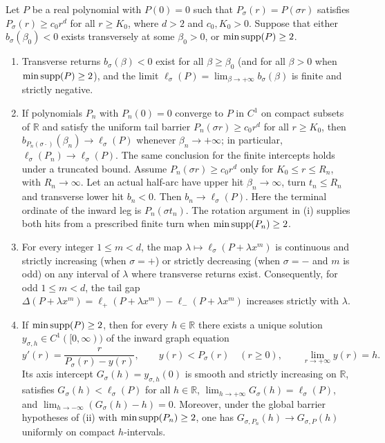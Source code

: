 \begin{lemma}\label{lem:tail-inward}
Let $P$ be a real polynomial with $P(0)=0$ such that $P_\sigma(r)=P(\sigma r)$ satisfies
$P_\sigma(r)\ge c_0 r^d$ for all $r\ge K_0$, where $d>2$ and $c_0,K_0>0$. Suppose that either
$b_\sigma(\beta_0)<0$ exists transversely at some $\beta_0>0$, or $\min\operatorname{supp}(P)\ge 2$.
\begin{enumerate}
  \item[\textup{(i)}] Transverse returns $b_\sigma(\beta)<0$ exist for all $\beta\ge\beta_0$ (and for
  all $\beta>0$ when $\min\operatorname{supp}(P)\ge 2$), and the limit
  $\ell_\sigma(P)=\lim_{\beta\to+\infty}b_\sigma(\beta)$ is finite and strictly negative.
  \item[\textup{(ii)}] If polynomials $P_n$ with $P_n(0)=0$ converge to $P$ in $C^1$ on compact
  subsets of $\mathbb{R}$ and satisfy the uniform tail barrier $P_n(\sigma r)\ge c_0 r^d$ for all
  $r\ge K_0$, then $b_{P_n(\sigma\cdot)}(\beta_n)\to\ell_\sigma(P)$ whenever $\beta_n\to+\infty$; in
  particular, $\ell_\sigma(P_n)\to\ell_\sigma(P)$.
  The same conclusion for the finite intercepts holds under a truncated
  bound. Assume $P_n(\sigma r)\ge c_0r^d$ only for $K_0\le r\le R_n$,
  with $R_n\to\infty$. Let an actual half-arc have upper hit $\beta_n\to\infty$,
  turn $t_n\le R_n$ and transverse lower hit $b_n<0$. Then $b_n\to\ell_\sigma(P)$.
  Here the terminal ordinate of the inward leg is $P_n(\sigma t_n)$.
  The rotation argument in (i) supplies both hits from a prescribed
  finite turn when $\min\operatorname{supp}(P_n)\ge2$.
  \item[\textup{(iii)}] For every integer $1\le m<d$, the map $\lambda\mapsto\ell_\sigma(P+\lambda
  x^m)$ is continuous and strictly increasing (when $\sigma=+$) or strictly decreasing (when
  $\sigma=-$ and $m$ is odd) on any interval of $\lambda$ where transverse returns exist.
  Consequently, for odd $1\le m<d$, the tail gap $\Delta(P+\lambda x^m)=\ell_+(P+\lambda
  x^m)-\ell_-(P+\lambda x^m)$ increases strictly with $\lambda$.
  \item[\textup{(iv)}] If $\min\operatorname{supp}(P)\ge 2$, then for every $h\in\mathbb{R}$ there exists a unique
  solution $y_{\sigma,h}\in C^1([0,\infty))$ of the inward graph equation
  \begin{equation}\label{eq:inward-ode}
    y'(r) = \frac{r}{P_\sigma(r) - y(r)}, \qquad y(r) < P_\sigma(r) \quad (r\ge 0), \qquad \lim_{r\to+\infty} y(r) = h.
  \end{equation}
  Its axis intercept $G_\sigma(h)=y_{\sigma,h}(0)$ is smooth and strictly increasing on $\mathbb{R}$,
  satisfies $G_\sigma(h)<\ell_\sigma(P)$ for all $h\in\mathbb{R}$,
  $\lim_{h\to+\infty}G_\sigma(h)=\ell_\sigma(P)$, and $\lim_{h\to-\infty}(G_\sigma(h)-h)=0$. Moreover,
  under the global barrier hypotheses of \textup{(ii)} with $\min\operatorname{supp}(P_n)\ge 2$, one has
  $G_{\sigma,P_n}(h)\to G_{\sigma,P}(h)$ uniformly on compact $h$-intervals.
\end{enumerate}
\end{lemma}


